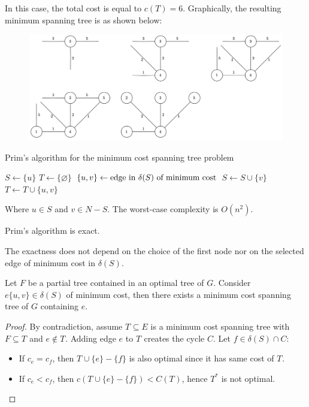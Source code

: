 \begin{example}
\begin{itemize}
\begin{itemize}
        \end{itemize}
    \end{itemize}
    In this case, the total cost is equal to $c(T)=6$. 
    Graphically, the resulting minimum spanning tree is as shown below:
    \begin{figure}[H]
        \centering
        \includegraphics[width=1\linewidth]{images/MST.png}
    \end{figure}
\end{example}
\begin{algorithm}[H]
    \caption{Prim's algorithm for the minimum cost spanning tree problem}
        \begin{algorithmic}[1]
            \State $S \leftarrow \{u\}$
            \State $T \leftarrow \{\varnothing\}$
                \State $\{u,v\}\leftarrow \textnormal{edge in } \delta(S) \textnormal{ of minimum cost}$
                \State $S \leftarrow S \cup \{v\}$
                \State $T \leftarrow T \cup \{u,v\}$
            \EndWhile
        \end{algorithmic}
\end{algorithm}
Where $u \in S$ and $v \in N-S$. 
The worst-case complexity is $O(n^2)$. 
\newpage
\begin{proposition}
    Prim's algorithm is exact. 
\end{proposition}        
The exactness does not depend on the choice of the first node nor on the selected edge of minimum cost in $\delta(S)$. 
\begin{property}
    Let $F$ be a partial tree contained in an optimal tree of $G$. 
    Consider $e\{u,v\}\in \delta(S)$ of minimum cost, then there exists a minimum cost spanning tree of $G$ containing $e$. 
\end{property}
\begin{proof}
    By contradiction, assume $T^{} \subseteq E$ is a minimum cost spanning tree with $F \subseteq T^{}$ and $e \notin T^{}$. 
    Adding edge $e$ to $T^{}$ creates the cycle $C$. 
    Let $f \in \delta(S) \cap C$: 
    \begin{itemize}
        \item If $c_e=c_f$, then $T^{}\cup\{e\}-\{f\}$ is also optimal since it has same cost of $T^{}$.
        \item If $c_e<c_f$, then $c\left(T^{}\cup\{e\}-\{f\}\right)<C(T^{})$, hence $T^{*}$ is not optimal.
    \end{itemize}
\end{proof}
